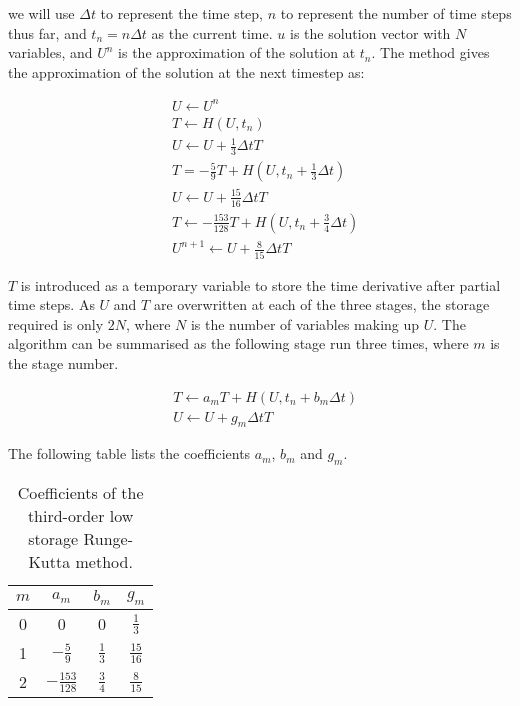 \noindent
we will use \(\Delta t\) to represent the time step, \(n\) to represent the number of time steps
thus far, and \(t_n = n \Delta t\) as the current time. \(u\) is the solution vector with \(N\)
variables, and \(U^n\) is the approximation of the solution at \(t_n\). The method gives the
approximation of the solution at the next timestep as:

\begin{equation} \label{equ:runge_kutta}
	\begin{split}
		& U \leftarrow U^n \\
		& T \leftarrow H \left( U, t_n \right) \\
		& U \leftarrow U + \frac{1}{3} \Delta t T \\
		& T = -\frac{5}{9} T + H \left( U, t_n + \frac{1}{3} \Delta t \right) \\
		& U \leftarrow U + \frac{15}{16} \Delta t T \\
		& T \leftarrow -\frac{153}{128} T + H \left( U, t_n + \frac{3}{4} \Delta t \right) \\
		& U^{n + 1} \leftarrow U + \frac{8}{15} \Delta t T
	\end{split}
\end{equation}

\(T\) is introduced as a temporary variable to store the time derivative after partial time steps.
As \(U\) and \(T\) are overwritten at each of the three stages, the storage required is only \(2
N\), where \(N\) is the number of variables making up \(U\). The algorithm can be summarised as the
following stage run three times, where \(m\) is the stage number.

\begin{equation} \label{equ:runge_kutta_stage}
	\begin{split}
		& T \leftarrow a_m T + H \left( U, t_n + b_m \Delta t \right) \\
		& U \leftarrow U + g_m \Delta t T
	\end{split}
\end{equation}

The following table lists the coefficients \(a_m\), \(b_m\) and \(g_m\).

\begin{table}[H]
	\centering
	\begin{tabular}{c c c c}
		\(m\) & \(a_m\) & \(b_m\) & \(g_m\) \\
		\midrule
		0 & 0 & 0 & \(\frac{1}{3}\) \\
		1 & \(-\frac{5}{9}\) & \(\frac{1}{3}\) & \(\frac{15}{16}\) \\
		2 & \(-\frac{153}{128}\) & \(\frac{3}{4}\) & \(\frac{8}{15}\) \\
	\end{tabular}
	\caption{Coefficients of the third-order low storage Runge-Kutta method.}\label{table:runge_kutta_coefficient}
\end{table}

